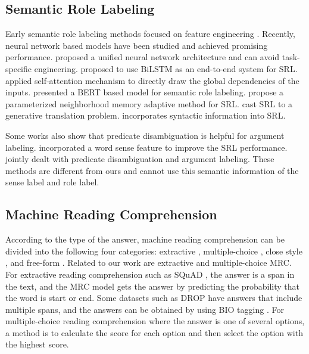 \documentclass[11pt]{article}
\begin{document}
\subsection{Semantic Role Labeling}
Early semantic role labeling methods focused on feature engineering \cite{zhao2009multilingual,pradhan2005semantic}. Recently, neural network based models have been studied and achieved promising performance. \citet{collobert2011natural} proposed a unified neural network architecture and can avoid task-specific engineering. \citet{Zhou2015EndtoendLO} proposed to use BiLSTM as an end-to-end system for SRL. \citet{Tan2018DeepSR} applied self-attention \cite{Vaswani2017AttentionIA}  mechanism to directly draw the global dependencies of the inputs. \citet{shi2019simple} presented a BERT \cite{Devlin2019BERTPO} based model for semantic role labeling. \citet{jindal2020improved} propose a parameterized neighborhood memory adaptive method for SRL. \citet{kalyanpur2020open,tanl,Blloshmi2021GeneratingSA} cast SRL to a generative translation problem. \citet{Zhou2020ParsingAS, Marcheggiani2020GraphCO} incorporates syntactic information into SRL.
\par
Some works also show that predicate disambiguation is helpful for argument labeling. \citet{che2010improving} incorporated a word sense feature to improve the SRL performance. \citet{che2010jointly,cai2018full,Conia2020BridgingTG} jointly dealt with  predicate disambiguation and  argument labeling. These methods are different from ours and cannot use this semantic information of the sense label and role label.

\subsection{Machine Reading Comprehension}
According to the type of the answer, machine reading comprehension can be divided into the following four categories: extractive \cite{rajpurkar2016squad}, multiple-choice \cite{lai2017race}, close style \cite{onishi2016did},  and free-form \cite{nguyen2016ms}. Related to our work are extractive and multiple-choice MRC. For extractive reading comprehension such as SQuAD \cite{rajpurkar2016squad}, the answer is a span in the text, and the MRC model \cite{Seo2017BidirectionalAF} gets the answer by predicting the probability that the word is start or end. Some datasets such as DROP \cite{dua2019drop} have answers that include multiple spans, and the answers can be obtained by using BIO tagging \cite{segal2019simple}. For multiple-choice reading comprehension where the answer is one of several options, a method \cite{pan2019improving} is to calculate the score for each option and then select the option with the highest score.
\end{document}
